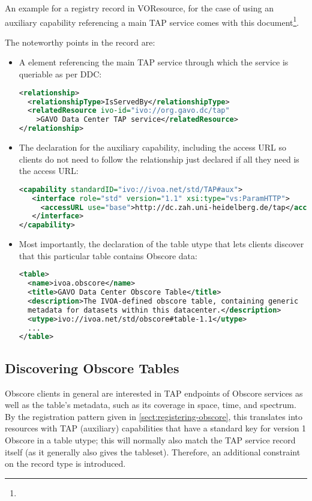 \documentclass[11pt,a4paper]{ivoa}
\begin{document}
An example for a registry record in VOResource, for the case of
using an auxiliary capability referencing a main TAP service comes with
this document\footnote{}.

The noteworthy points in the record are:

\begin{itemize}
\item A  element referencing the main TAP service
through which the service is queriable as per DDC:
\begin{lstlisting}[language=XML,basicstyle=\footnotesize]
<relationship>
  <relationshipType>IsServedBy</relationshipType>
  <relatedResource ivo-id="ivo://org.gavo.dc/tap"
    >GAVO Data Center TAP service</relatedResource>
</relationship>
\end{lstlisting}

\item The declaration for the auxiliary capability, including the access
URL so clients do not need to follow the relationship just declared if
all they need is the access URL:
\begin{lstlisting}[language=XML,basicstyle=\footnotesize]
<capability standardID="ivo://ivoa.net/std/TAP#aux">
   <interface role="std" version="1.1" xsi:type="vs:ParamHTTP">
     <accessURL use="base">http://dc.zah.uni-heidelberg.de/tap</accessURL>
   </interface>
</capability>
\end{lstlisting}

\item Most importantly, the declaration of the table utype that lets
clients discover that this particular table contains Obscore data:
\begin{lstlisting}[language=XML,basicstyle=\footnotesize]
<table>
  <name>ivoa.obscore</name>
  <title>GAVO Data Center Obscore Table</title>
  <description>The IVOA-defined obscore table, containing generic
  metadata for datasets within this datacenter.</description>
  <utype>ivo://ivoa.net/std/obscore#table-1.1</utype>
  ...
</table>
\end{lstlisting}
\end{itemize}

\subsection{Discovering Obscore Tables}

Obscore clients in general are interested in TAP endpoints of Obscore
services as well as the table's metadata, such as its coverage in space,
time, and spectrum.  By the  registration pattern given in
\ref{sect:registering-obscore}, this translates into resources with TAP
(auxiliary) capabilities that have a standard key for version 1 Obscore
in a table utype; this will normally also match the TAP service record
itself (as it generally also gives the tableset). Therefore, an
additional constraint on the record type is introduced.
\end{document}

